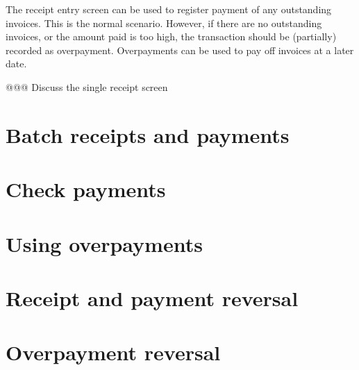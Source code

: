 The receipt entry screen can be used to register payment of any outstanding invoices. This is the
normal scenario. However, if there are no outstanding invoices, or the amount paid is too high,
the transaction should be (partially) recorded as overpayment. Overpayments can be used to
pay off invoices at a later date.


@@@ Discuss the single receipt screen



\section{Batch receipts and payments}
\label{sec-workflows-payment-processing-batch-payments}

\section{Check payments}
\label{sec-workflows-payment-processing-check-payments}


\section{Using overpayments}
\label{sec-workflows-payment-processing-overpayments}

\section{Receipt and payment reversal}
\label{sec-workflows-payment-processing-reversal}

\section{Overpayment reversal}
\label{sec-workflows-payment-processing-overpayment-reversal}


